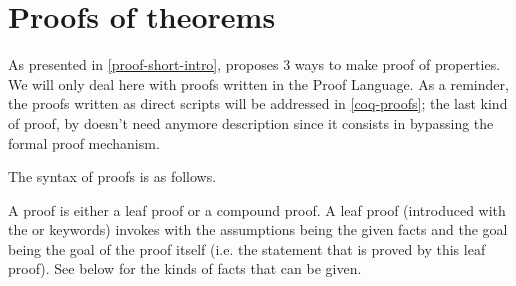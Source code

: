 
\section{Proofs of theorems}

As presented in \ref{proof-short-intro}, {\focal} proposes 3 ways to
make proof of properties. We will only deal here with proofs written
in the {\focal} Proof Language. As a reminder, the proofs written as
direct {\coq} scripts will be addressed in \ref{coq-proofs}; the
last kind of proof, by  doesn't need anymore description
since it consists in bypassing the formal proof mechanism.

The syntax of proofs is as follows.
\label{zenon-and-dependencies}
\begin{syn}
 \is
      
\alt {} 
\alt {}
\alt {}  
\alt {}  
\end{syn}

\begin{syn}
 \is
\end{syn}

\begin{syn}
 \is
\alt {}  
\alt {}  
\end{syn}




A proof is either a leaf proof or a compound proof. A leaf proof
(introduced with the  or  keywords)
invokes {\zenon} with the
assumptions being the given facts and the goal being the goal of the
proof itself (i.e. the statement that is proved by this leaf proof).
See below for the kinds of facts that can be given.

